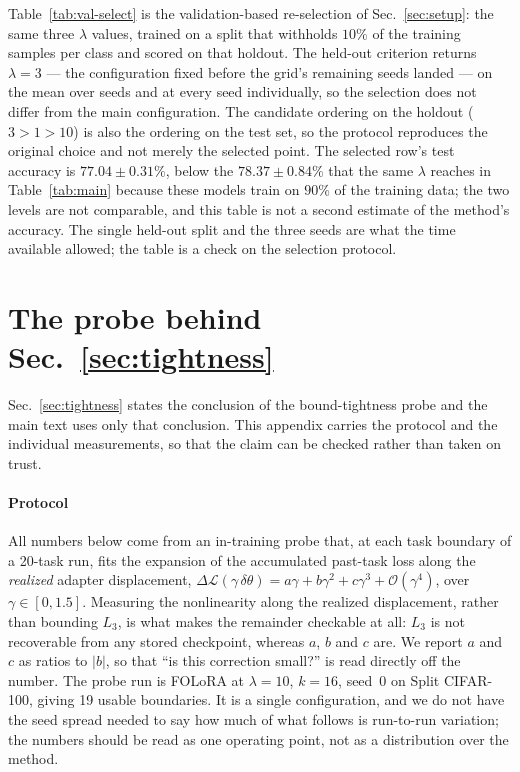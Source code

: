 



Table~\ref{tab:val-select} is the validation-based re-selection of
Sec.~\ref{sec:setup}: the same three $\lambda$ values, trained on a split that withholds
$10\%$ of the training samples per class and scored on that holdout. The held-out criterion
returns $\lambda{=}3$ --- the configuration fixed before the grid's remaining seeds landed ---
on the mean over seeds and at every seed individually, so the selection does not differ from
the main configuration. The candidate ordering on the holdout ($3>1>10$) is also the ordering
on the test set, so the protocol reproduces the original choice and not merely the selected
point. The selected row's test accuracy is $77.04\pm0.31\%$, below the $78.37\pm0.84\%$ that
the same $\lambda$ reaches in Table~\ref{tab:main} because these models train on $90\%$ of
the training data; the two levels are not comparable, and this table is not a second estimate
of the method's accuracy.
The single held-out split and the three seeds are what the time available allowed; the table
is a check on the selection protocol.


\section{The probe behind Sec.~\ref{sec:tightness}}
\label{app:tightness}

Sec.~\ref{sec:tightness} states the conclusion of the bound-tightness probe and the main
text uses only that conclusion. This appendix carries the protocol and the individual
measurements, so that the claim can be checked rather than taken on trust.

\paragraph{Protocol}
All numbers below come from an in-training probe that, at each task boundary of a 20-task
run, fits the expansion of the accumulated past-task loss along the \emph{realized}
adapter displacement,
$\Delta\mathcal{L}(\gamma\,\delta\theta)=a\gamma+b\gamma^{2}+c\gamma^{3}+\mathcal{O}(\gamma^{4})$,
over $\gamma\in[0,1.5]$. Measuring the nonlinearity along the realized displacement, rather
than bounding $L_3$, is what makes the remainder checkable at all: $L_3$ is not recoverable
from any stored checkpoint, whereas $a$, $b$ and $c$ are. We report $a$ and $c$ as ratios
to $|b|$, so that ``is this correction small?'' is read directly off the number. The probe
run is FOLoRA at $\lambda{=}10$, $k{=}16$, seed~0 on Split CIFAR-100, giving 19 usable
boundaries. It is a single configuration, and we do not have the seed spread needed to say
how much of what follows is run-to-run variation; the numbers should be read as one
operating point, not as a distribution over the method.

